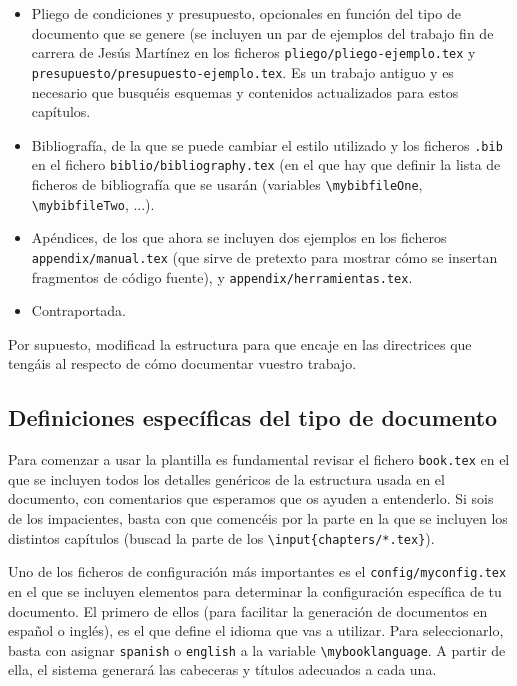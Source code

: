 \begin{itemize}
\item Pliego de condiciones y presupuesto, opcionales en función del
  tipo de documento que se genere (se incluyen un
  par de ejemplos del trabajo fin de carrera de Jesús Martínez en los
  ficheros \texttt{pliego/pliego-ejemplo.tex} y
  \texttt{presupuesto/presupuesto-ejemplo.tex}. Es un trabajo antiguo y
  es necesario que busquéis esquemas y contenidos actualizados para
  estos capítulos.

\item Bibliografía, de la que se puede cambiar el estilo utilizado y los
  ficheros \texttt{.bib} en el fichero
  \texttt{biblio/bibliography.tex} (en el que hay que definir la lista
  de ficheros de bibliografía que se usarán (variables
  \texttt{\textbackslash{}mybibfileOne},
  \texttt{\textbackslash{}mybibfileTwo}, ...).

\item Apéndices, de los que ahora se incluyen dos ejemplos en los
  ficheros \texttt{appendix/manual.tex} (que sirve de pretexto para
  mostrar cómo se insertan fragmentos de código fuente), y
  \texttt{appendix/herramientas.tex}.
\item Contraportada.
\end{itemize}

Por supuesto, modificad la estructura para que encaje en las directrices
que tengáis al respecto de cómo documentar vuestro trabajo.


\subsection{Definiciones específicas del tipo de documento}
\label{sec:definicion-del-tipo}

Para comenzar a usar la plantilla es fundamental revisar el fichero
\texttt{book.tex} en el que se incluyen todos los detalles genéricos de
la estructura usada en el documento, con comentarios que esperamos que
os ayuden a entenderlo. Si sois de los impacientes, basta con que
comencéis por la parte en la que se incluyen los distintos capítulos
(buscad la parte de los \texttt{\textbackslash{}input\{chapters/*.tex\}}).

Uno de los ficheros de configuración más importantes es el
\texttt{config/myconfig.tex} en el que se incluyen elementos para
determinar la configuración específica de tu documento. El primero de
ellos (para facilitar la generación de documentos en español o inglés),
es el que define el idioma que vas a utilizar. Para seleccionarlo, basta
con asignar \texttt{spanish} o \texttt{english} a la variable
\texttt{\textbackslash{}mybooklanguage}. A partir de ella, el sistema
generará las cabeceras y títulos adecuados a cada una.

